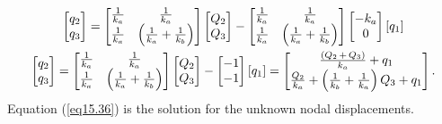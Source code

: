 \documentclass{AeroStructure-ERJohnson}
\begin{document}
\begin{gather}
\left[\begin{array}{@{}l@{}}q_{2} \\q_{3}\end{array}\right]=\left[\begin{array}{@{}cc@{}}\frac{1}{k_{a}} & \frac{1}{k_{a}} \\ \frac{1}{k_{a}} & \left(\frac{1}{k_{a}}+\frac{1}{k_{b}}\right)\end{array}\right]\left[\begin{array}{@{}l@{}}Q_{2} \\Q_{3}\end{array}\right]-\left[\begin{array}{@{}cc@{}}\frac{1}{k_{a}} & \frac{1}{k_{a}} \\ \frac{1}{k_{a}} & \left(\frac{1}{k_{a}}+\frac{1}{k_{b}}\right)\end{array}\right]\left[\begin{array}{@{}c@{}}-k_{a} \\0\end{array}\right]\left[q_{1}\right] \nonumber\\ \left[\begin{array}{@{}l@{}} q_{2} \\ q_{3}\end{array}\right]=\left[\begin{array}{@{}cc@{}}\frac{1}{k_{a}} & \frac{1}{k_{a}} \\ \frac{1}{k_{a}} & \left(\frac{1}{k_{a}}+\frac{1}{k_{b}}\right)\end{array}\right]\left[\begin{array}{@{}l@{}}Q_{2} \\Q_{3}\end{array}\right]-\left[\begin{array}{@{}c@{}}-1 \\-1\end{array}\right]\left[q_{1}\right]=\left[\begin{array}{@{}c@{}}\frac{\left(Q_{2}\,+\,Q_{3}\right)}{k_{a}}+q_{1} \\\frac{Q_{2}}{k_{a}}+\left(\frac{1}{k_{b}}+\frac{1}{k_{a}}\right) Q_{3}+q_{1}\end{array}\right].\label{eq15.36}
\end{gather}
Equation (\ref{eq15.36}) is the solution for the unknown nodal displacements.
\end{document}
